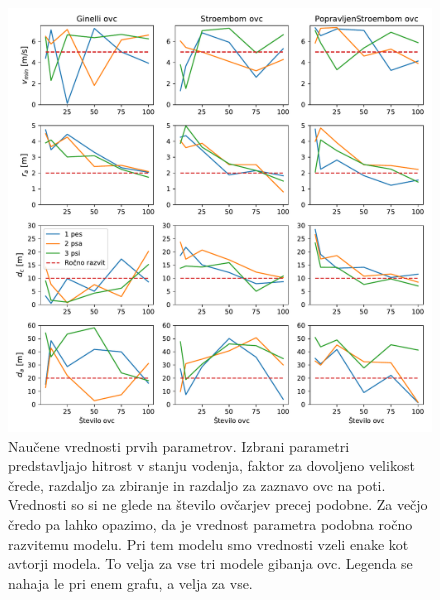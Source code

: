 \begin{figure}[H]  %
	\centering
	\includegraphics[width=\textwidth]{../poglavja/grafi/geni-1-4.pdf}
	\caption[Naučene vrednosti prvih parametrov]{Naučene vrednosti prvih parametrov. Izbrani parametri predstavljajo hitrost v stanju vodenja, faktor za dovoljeno velikost črede, razdaljo za zbiranje in razdaljo za zaznavo ovc na poti. Vrednosti so si ne glede na število ovčarjev precej podobne. Za večjo čredo pa lahko opazimo, da je vrednost parametra podobna ročno razvitemu modelu. Pri tem modelu smo vrednosti vzeli enake kot avtorji modela. To velja za vse tri modele gibanja ovc. Legenda se nahaja le pri enem grafu, a velja za vse.} %
	\label{fig:gen1-4}
\end{figure}

